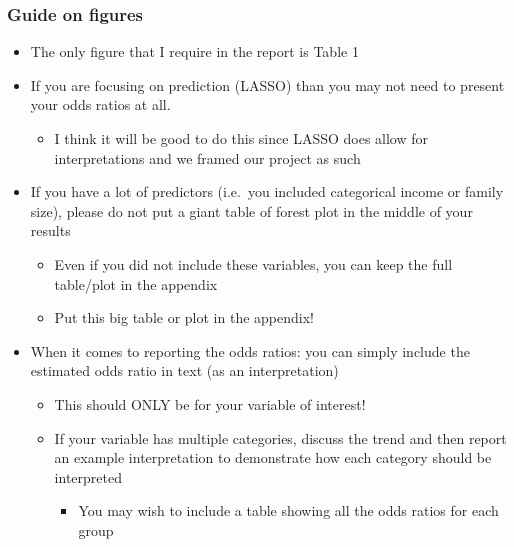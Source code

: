 \documentclass[
  letterpaper,
  DIV=11,
  numbers=noendperiod]{scrartcl}
\providecommand{\tightlist}{%
  \setlength{\itemsep}{0pt}\setlength{\parskip}{0pt}}\usepackage{longtable,booktabs,array}
\begin{document}
\hypertarget{guide-on-figures}{%
\subsubsection{Guide on figures}\label{guide-on-figures}}

\begin{itemize}
\tightlist
\item
  The only figure that I require in the report is Table 1
\item
  If you are focusing on prediction (LASSO) than you may not need to
  present your odds ratios at all.

  \begin{itemize}
  \tightlist
  \item
    I think it will be good to do this since LASSO does allow for
    interpretations and we framed our project as such
  \end{itemize}
\item
  If you have a lot of predictors (i.e.~you included categorical income
  or family size), please do not put a giant table of forest plot in the
  middle of your results

  \begin{itemize}
  \tightlist
  \item
    Even if you did not include these variables, you can keep the full
    table/plot in the appendix
  \item
    Put this big table or plot in the appendix!
  \end{itemize}
\item
  When it comes to reporting the odds ratios: you can simply include the
  estimated odds ratio in text (as an interpretation)

  \begin{itemize}
  \tightlist
  \item
    This should ONLY be for your variable of interest!
  \item
    If your variable has multiple categories, discuss the trend and then
    report an example interpretation to demonstrate how each category
    should be interpreted

    \begin{itemize}
    \tightlist
    \item
      You may wish to include a table showing all the odds ratios for
      each group
    \end{itemize}
  \end{itemize}
\end{itemize}
\end{document}
